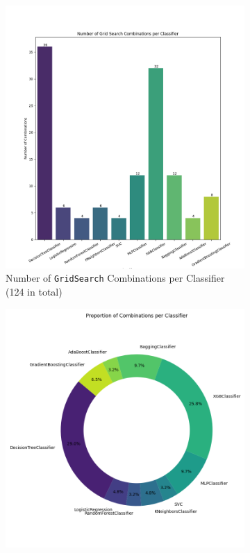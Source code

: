 \begin{figure}[H]
    \centering
    \begin{subfigure}[b]{0.45\linewidth}
        \centering
        \includegraphics[width=\linewidth]{assets/images/methodology/grid_search_combinations_per_classifier.png}
        \caption{Number of \texttt{GridSearch} Combinations per Classifier (124 in total)}
        \label{fig:grid_search_combinations_per_classifier}
    \end{subfigure}
    \hfill
    \begin{subfigure}[b]{0.45\linewidth}
        \centering
        \includegraphics[width=\linewidth]{assets/images/methodology/grid_search_donat.png}

\end{subfigure}
\end{figure}
